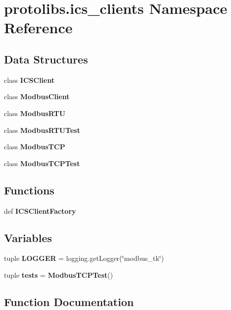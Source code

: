 \section{protolibs.\+ics\+\_\+clients Namespace Reference}
\label{namespaceprotolibs_1_1ics__clients}
\subsection*{Data Structures}
\begin{DoxyCompactItemize}
\item 
class {\bf I\+C\+S\+Client}
\item 
class {\bf Modbus\+Client}
\item 
class {\bf Modbus\+R\+T\+U}
\item 
class {\bf Modbus\+R\+T\+U\+Test}
\item 
class {\bf Modbus\+T\+C\+P}
\item 
class {\bf Modbus\+T\+C\+P\+Test}
\end{DoxyCompactItemize}
\subsection*{Functions}
\begin{DoxyCompactItemize}
\item 
def {\bf I\+C\+S\+Client\+Factory}
\end{DoxyCompactItemize}
\subsection*{Variables}
\begin{DoxyCompactItemize}
\item 
tuple {\bf L\+O\+G\+G\+E\+R} = logging.\+get\+Logger(\char`\"{}modbus\+\_\+tk\char`\"{})
\item 
tuple {\bf tests} = {\bf Modbus\+T\+C\+P\+Test}()
\end{DoxyCompactItemize}


\subsection{Function Documentation}
